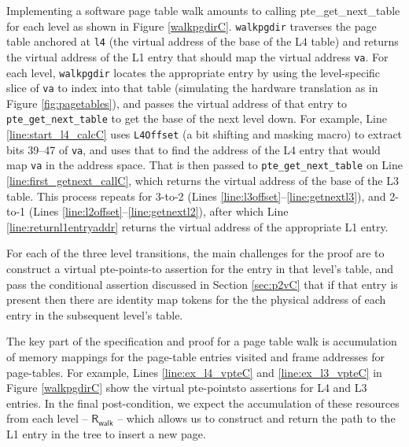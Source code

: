 Implementing a software page table walk amounts to calling \textsf{pte\_get\_next\_table} for each level as shown in Figure \ref{walkpgdirC}. 
\lstinline|walkpgdir| traverses the page table anchored at \lstinline|l4| (the virtual address of the base of the L4 table)
and returns the virtual address of the L1 entry that should map the virtual address \lstinline|va|.
For each level, \lstinline|walkpgdir| locates the appropriate entry by using the level-specific slice of \lstinline|va| to index into
that table (simulating the hardware translation as in Figure \ref{fig:pagetables}), and passes the virtual address of that entry to
\lstinline|pte_get_next_table| to get the base of the next level down.
For example, Line \ref{line:start_l4_calcC} uses \lstinline|L4Offset| (a bit shifting and masking macro) to extract bits 39--47 of \lstinline|va|,
and uses that to find the address of the L4 entry that would map \lstinline|va| in the address space.
That is then passed to \lstinline|pte_get_next_table| on Line \ref{line:first_getnext_callC}, which
returns the virtual address of the base of the L3 table. This process repeats for 3-to-2 (Lines \ref{line:l3offset}--\ref{line:getnextl3}),
and 2-to-1 (Lines \ref{line:l2offset}--\ref{line:getnextl2}), after which Line \ref{line:returnl1entryaddr} returns
the virtual address of the appropriate L1 entry.

For each of the three level transitions, the main challenges for the proof are to
construct a virtual pte-points-to assertion for the entry in that level's table,
and pass the conditional assertion discussed in Section \ref{sec:p2vC} that if that entry is present then there are
identity map tokens for the the physical address of each entry in the subsequent level's table.

The key part of the specification and proof for a page table walk is accumulation of memory mappings for the page-table entries 
visited and frame addresses for page-tables. 
For example, Lines \ref{line:ex_l4_vpteC} and \ref{line:ex_l3_vpteC} in Figure \ref{walkpgdirC} show the virtual pte-pointsto assertions for L4 and L3 entries.
In the final post-condition, we expect the accumulation of these resources from each level -- $\textsf{R}_{\textsf{walk}}$ -- 
which allows us to construct and return the path to the L1 entry in the tree to insert a new page.  

